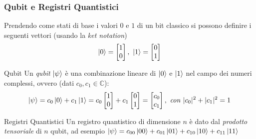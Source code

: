 \documentclass{beamer}
\begin{document}
\begin{frame}
    \frametitle{Qubit e Registri Quantistici}
    Prendendo come stati di base i valori $0$ e $1$ di un bit classico si possono definire i seguenti vettori (usando la \textit{ket notation})
    \begin{equation*}
        \ket{0} = \begin{bmatrix} 1 \\ 0 \end{bmatrix},\ 
        \ket{1} = \begin{bmatrix} 0 \\ 1 \end{bmatrix}
    \end{equation*}
    \begin{block}{Qubit}
        Un \emph{qubit} $\ket{\psi}$ è una combinazione lineare di $\ket{0}$ e $\ket{1}$ nel campo dei numeri complessi, ovvero (dati $c_0, c_1 \in \mathbb{C}$):
        \begin{equation*}
            \ket{\psi} = c_0\ket{0}+c_1\ket{1} = c_0\begin{bmatrix} 1 \\ 0 \end{bmatrix}+ c_1\begin{bmatrix} 0 \\ 1 \end{bmatrix} = \begin{bmatrix} c_0 \\ c_1 \end{bmatrix},\ \mathit{con}\ |c_0|^2+|c_1|^2=1
        \end{equation*}
    \end{block}
    \begin{block}{Registri Quantistici}
        Un registro quantistico di dimensione $n$ è dato dal \textit{prodotto tensoriale} di $n$ qubit, ad esempio $\ket{\psi}=c_{00}\ket{00}+c_{01}\ket{01}+c_{10}\ket{10}+c_{11}\ket{11}$
    \end{block}
\end{frame}
\end{document}

